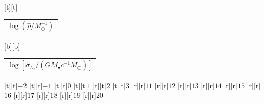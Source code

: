%    
%
%
\begin{psfrags}%
\psfragscanon%
%
[t][t]{\color[rgb]{0,0,0}\setlength{\tabcolsep}{0pt}\begin{tabular}{c}{\Large$\log\left(\hat{\rho}/M_\odot^{-1}\right)$}\end{tabular}}%
[b][b]{\color[rgb]{0,0,0}\setlength{\tabcolsep}{0pt}\begin{tabular}{c}{\Large$\log\left[\hat{\sigma}_{L_z}/\left(G M_\bullet c^{-1} M_\odot\right)\right]$}\end{tabular}}%
%
[t][t]{$-2$}%
[t][t]{$-1$}%
[t][t]{$0$}%
[t][t]{$1$}%
[t][t]{$2$}%
[t][t]{$3$}%
%
[r][r]{$11$}%
[r][r]{$12$}%
[r][r]{$13$}%
[r][r]{$14$}%
[r][r]{$15$}%
[r][r]{$16$}%
[r][r]{$17$}%
[r][r]{$18$}%
[r][r]{$19$}%
[r][r]{$20$}%
%
%
\end{psfrags}%
%
